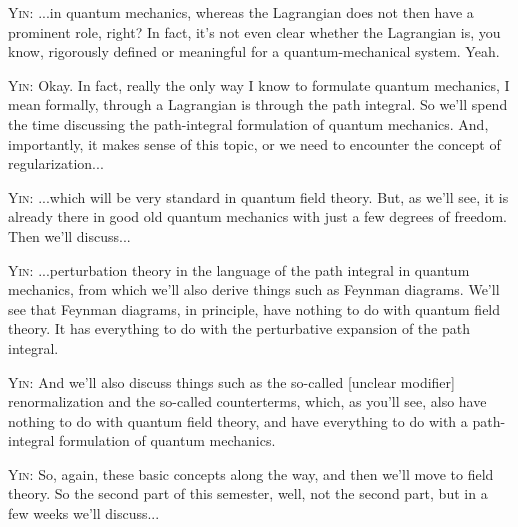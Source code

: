 \noindent\textsc{Yin:} ...in quantum mechanics, whereas the Lagrangian does not then have a prominent role, right? In fact, it's not even clear whether the Lagrangian is, you know, rigorously defined or meaningful for a quantum-mechanical system. Yeah.\par

\noindent\textsc{Yin:} Okay. In fact, really the only way I know to formulate quantum mechanics, I mean formally, through a Lagrangian is through the path integral. So we'll spend the time discussing the path-integral formulation of quantum mechanics. And, importantly, it makes sense of this topic, or we need to encounter the concept of regularization...\par

\noindent\textsc{Yin:} ...which will be very standard in quantum field theory. But, as we'll see, it is already there in good old quantum mechanics with just a few degrees of freedom. Then we'll discuss...\par

\noindent\textsc{Yin:} ...perturbation theory in the language of the path integral in quantum mechanics, from which we'll also derive things such as Feynman diagrams. We'll see that Feynman diagrams, in principle, have nothing to do with quantum field theory. It has everything to do with the perturbative expansion of the path integral.\par

\noindent\textsc{Yin:} And we'll also discuss things such as the so-called [unclear modifier] renormalization and the so-called counterterms, which, as you'll see, also have nothing to do with quantum field theory, and have everything to do with a path-integral formulation of quantum mechanics.\par


\noindent\textsc{Yin:} So, again, these basic concepts along the way, and then we'll move to field theory. So the second part of this semester, well, not the second part, but in a few weeks we'll discuss...\par

